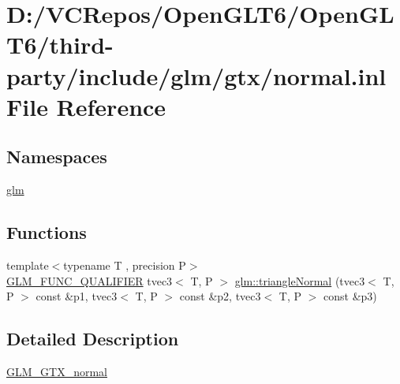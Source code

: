 \hypertarget{normal_8inl}{}\section{D\+:/\+V\+C\+Repos/\+Open\+G\+L\+T6/\+Open\+G\+L\+T6/third-\/party/include/glm/gtx/normal.inl File Reference}
\label{normal_8inl}
\subsection*{Namespaces}
\begin{DoxyCompactItemize}
\item 
 \mbox{\hyperlink{namespaceglm}{glm}}
\end{DoxyCompactItemize}
\subsection*{Functions}
\begin{DoxyCompactItemize}
\item 
{\footnotesize template$<$typename T , precision P$>$ }\\\mbox{\hyperlink{setup_8hpp_a33fdea6f91c5f834105f7415e2a64407}{G\+L\+M\+\_\+\+F\+U\+N\+C\+\_\+\+Q\+U\+A\+L\+I\+F\+I\+ER}} tvec3$<$ T, P $>$ \mbox{\hyperlink{group__gtx__normal_ga7842850bcda582f1756883e3ed950e14}{glm\+::triangle\+Normal}} (tvec3$<$ T, P $>$ const \&p1, tvec3$<$ T, P $>$ const \&p2, tvec3$<$ T, P $>$ const \&p3)
\end{DoxyCompactItemize}


\subsection{Detailed Description}
\mbox{\hyperlink{group__gtx__normal}{G\+L\+M\+\_\+\+G\+T\+X\+\_\+normal}} 